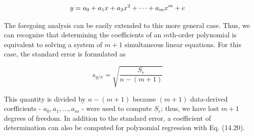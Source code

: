 \documentclass[../main.tex]{subfiles}
\begin{document}
\begin{equation}
	\notag
	y = a_0 + a_1 x + a_2 x^2 + \cdots + a_m x^m + e
\end{equation}

The foregoing analysis can be easily extended to this more general case. Thus, we can recognize that determining the coefficients of an $m$th-order polynomial is equivalent to solving a system of $m + 1$ simultaneous linear equations. For this case, the standard error is formulated as

\begin{equation}
	\tag{15.3}
	s_{y/x} = \sqrt{\frac{S_r}{n - (m + 1)}}
\end{equation}

This quantity is divided by $n - (m + 1)$ because $(m + 1)$ data-derived coefficients - $a_0, a_1, ..., a_m$ - were used to compute $S_r$; thus, we have lost $m + 1$ degrees of freedom. In addition to the standard error, a coefficient of determination can also be computed for polynomial regression with Eq. (14.20).
\end{document}
